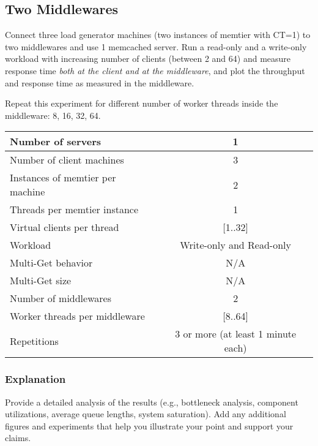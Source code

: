 \documentclass[11pt,a4paper]{article}
\begin{document}
\subsection{Two Middlewares}

Connect three load generator machines (two instances of memtier with CT=1) to two middlewares and use 1 memcached server. Run a read-only and a write-only workload with increasing number of clients (between 2 and 64) and measure response time \emph{both at the client and at the middleware}, and plot the throughput and response time as measured in the middleware.

Repeat this experiment for different number of worker threads inside the middleware: 8, 16, 32, 64.

\begin{center}
	\scriptsize{
		\begin{tabular}{|l|c|}
			\hline Number of servers                & 1                        \\ 
			\hline Number of client machines        & 3                        \\ 
			\hline Instances of memtier per machine & 2                        \\ 
			\hline Threads per memtier instance     & 1                        \\
			\hline Virtual clients per thread       & [1..32]                  \\ 
			\hline Workload                         & Write-only and Read-only \\
			\hline Multi-Get behavior               & N/A                      \\
			\hline Multi-Get size                   & N/A                      \\
			\hline Number of middlewares            & 2                        \\
			\hline Worker threads per middleware    & [8..64]                  \\
			\hline Repetitions                      & 3 or more (at least 1 minute each)                \\ 
			\hline 
		\end{tabular}
	} 
\end{center}

\subsubsection{Explanation}

Provide a detailed analysis of the results (e.g., bottleneck analysis, component utilizations, average queue lengths, system saturation). Add any additional figures and experiments that help you illustrate your point and support your claims.
\end{document}
